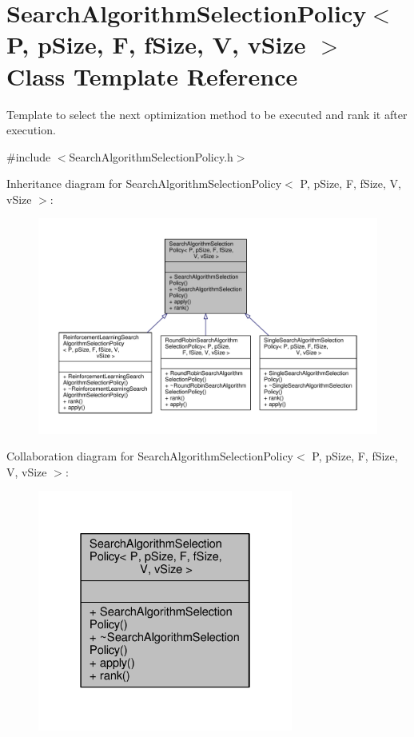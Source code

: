 \hypertarget{classSearchAlgorithmSelectionPolicy}{}\section{Search\+Algorithm\+Selection\+Policy$<$ P, p\+Size, F, f\+Size, V, v\+Size $>$ Class Template Reference}
\label{classSearchAlgorithmSelectionPolicy}


Template to select the next optimization method to be executed and rank it after execution.  




{\ttfamily \#include $<$Search\+Algorithm\+Selection\+Policy.\+h$>$}



Inheritance diagram for Search\+Algorithm\+Selection\+Policy$<$ P, p\+Size, F, f\+Size, V, v\+Size $>$\+:
\nopagebreak
\begin{figure}[H]
\begin{center}
\leavevmode
\includegraphics[width=350pt]{classSearchAlgorithmSelectionPolicy__inherit__graph}
\end{center}
\end{figure}


Collaboration diagram for Search\+Algorithm\+Selection\+Policy$<$ P, p\+Size, F, f\+Size, V, v\+Size $>$\+:
\nopagebreak
\begin{figure}[H]
\begin{center}
\leavevmode
\includegraphics[width=238pt]{classSearchAlgorithmSelectionPolicy__coll__graph}
\end{center}
\end{figure}
